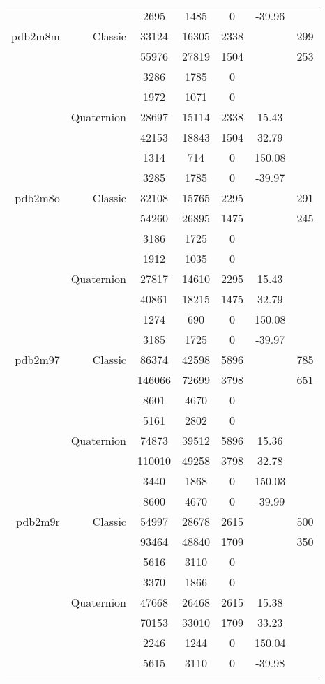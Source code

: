 \begin{xltabular}{\textwidth}{r|rcccSc}
& & 2695 & 1485 & 0 & -39.96 & \\ \addlinespace
pdb2m8m & Classic & 33124 & 16305 & 2338 & & 299 \\
& & 55976 & 27819 & 1504 & & 253 \\
& & 3286 & 1785 & 0 & & \\
& & 1972 & 1071 & 0 & & \\
& Quaternion & 28697 & 15114 & 2338 & 15.43 & \\
& & 42153 & 18843 & 1504 & 32.79 & \\
& & 1314 & 714 & 0 & 150.08 & \\
& & 3285 & 1785 & 0 & -39.97 & \\ \addlinespace
pdb2m8o & Classic & 32108 & 15765 & 2295 & & 291 \\
& & 54260 & 26895 & 1475 & & 245 \\
& & 3186 & 1725 & 0 & & \\
& & 1912 & 1035 & 0 & & \\
& Quaternion & 27817 & 14610 & 2295 & 15.43 & \\
& & 40861 & 18215 & 1475 & 32.79 & \\
& & 1274 & 690 & 0 & 150.08 & \\
& & 3185 & 1725 & 0 & -39.97 & \\ \addlinespace
pdb2m97 & Classic & 86374 & 42598 & 5896 & & 785 \\
& & 146066 & 72699 & 3798 & & 651 \\
& & 8601 & 4670 & 0 & & \\
& & 5161 & 2802 & 0 & & \\
& Quaternion & 74873 & 39512 & 5896 & 15.36 & \\
& & 110010 & 49258 & 3798 & 32.78 & \\
& & 3440 & 1868 & 0 & 150.03 & \\
& & 8600 & 4670 & 0 & -39.99 & \\ \addlinespace
pdb2m9r & Classic & 54997 & 28678 & 2615 & & 500 \\
& & 93464 & 48840 & 1709 & & 350 \\
& & 5616 & 3110 & 0 & & \\
& & 3370 & 1866 & 0 & & \\
& Quaternion & 47668 & 26468 & 2615 & 15.38 & \\
& & 70153 & 33010 & 1709 & 33.23 & \\
& & 2246 & 1244 & 0 & 150.04 & \\
& & 5615 & 3110 & 0 & -39.98 & \\ \addlinespace

\end{xltabular}
